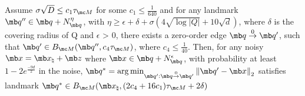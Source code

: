 \begin{lemma}\label{Phase II ZOE gives an acceptable landmark}
{Assume $\sigma \sqrt{D} \leq c_1 \tau_{\mc M}$ for some $c_1 \leq \frac{1}{640}$} and for any landmark $\mb q'' \in \mb q + N_{\mb q}^{\eta}$, with {$ \eta \geq  \epsilon + \delta + \sigma\left(4\sqrt{\log|Q|}+10\sqrt{d}\right)$}, where $\delta$ is the covering radius of Q and $\epsilon$ > 0, there exists a zero-order edge $\mb q \overset{0}{\rightarrow} \mb q'$, such that $\mb q' \in B_{\mc M}(\mb q'', c_4\tau_{\mc M})$, where $c_4 \le \frac{1}{40}$. Then, for any noisy $\mb x = \mb x_\natural + \mb z$ where $\mb x \in \mb q+N_{\mb q}^{\epsilon}$, with probability at least {$ 1 - 2e^{\frac{-9d}{2}}$} in the noise,  $\mb q^* = \arg\min_{\mb q': \mb q \overset{0}{\rightarrow} \mb q'}\left\|\mb q' -\mb x\right\|_2$ satisfies landmark  $\mb q^* \in B_{\mc M}(\mb x_\natural,{(2c_4 + 16 c_1)\tau_{\mc M}+2\delta})$
\end{lemma}

